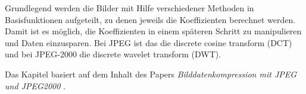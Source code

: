 Grundlegend werden die Bilder mit Hilfe verschiedener Methoden in Basisfunktionen aufgeteilt, zu denen jeweils die Koeffizienten berechnet werden.
Damit ist es möglich, die Koeffizienten in einem späteren Schritt zu manipulieren und Daten einzusparen. 
Bei JPEG ist das die discrete cosine transform (DCT) und bei JPEG-2000 die discrete wavelet transform (DWT).
%
%
%

Das Kapitel basiert auf dem Inhalt des Papers \textit{Bilddatenkompression mit JPEG und JPEG2000} \cite{jpeg:laurahochstrat}.
